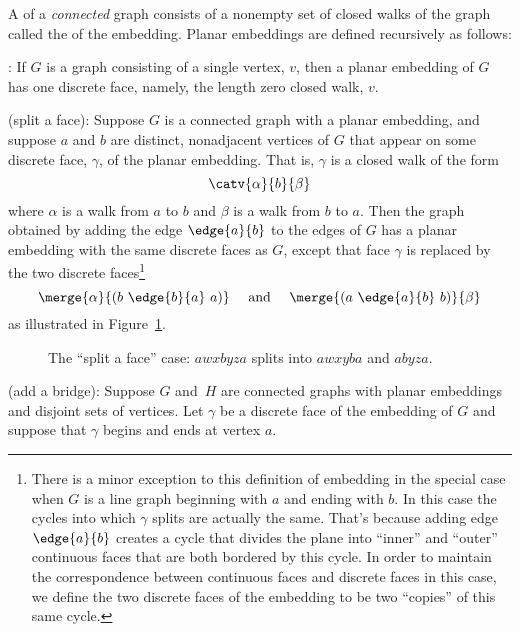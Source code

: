 \begin{definition}\label{def:embedding}%
A  of a \emph{connected} graph consists of a
nonempty set of closed walks of the graph called the  of the embedding.  Planar embeddings are defined recursively
as follows:

: If $G$ is a graph consisting of a single
vertex, $v$, then a planar embedding of $G$ has one discrete face,
namely, the length zero closed walk, $v$.

 (split a face): Suppose $G$ is a
connected graph with a planar embedding, and suppose $a$ and $b$ are
distinct, nonadjacent vertices of $G$ that appear on some discrete
face, $\gamma$, of the planar embedding.  That is, $\gamma$ is a
closed walk of the form
\[
\catv{\alpha}{b}{\beta}
\]
where $\alpha$ is a walk from $a$ to $b$ and $\beta$ is a walk from
$b$ to $a$.  Then the graph obtained by adding the edge $\edge{a}{b}$
to the edges of $G$ has a planar embedding with the same discrete
faces as $G$, except that face $\gamma$ is replaced by the two
discrete faces\footnote{\label{C} There is a minor exception to this
  definition of embedding in the special case when $G$ is a line graph
  beginning with $a$ and ending with $b$.  In this case the cycles
  into which $\gamma$ splits are actually the same.  That's because
  adding edge $\edge{a}{b}$ creates a cycle that divides the plane
  into ``inner'' and ``outer'' continuous faces that are both bordered
  by this cycle.  In order to maintain the correspondence between
  continuous faces and discrete faces in this case, we define the two
  discrete faces of the embedding to be two ``copies'' of this same
  cycle.}
\[
\merge{\alpha}{(b\ \edge{b}{a}\ a)}
 \quad \text{ and } \quad \merge{(a\ \edge{a}{b}\ b)}{\beta}
\]
as illustrated in Figure~\ref{fig:face-splitting}.

\begin{figure}


\caption{The ``split a face'' case: $awxbyza$ splits into $awxyba$ and $abyza$.}
\label{fig:face-splitting}
\end{figure}

 (add a bridge): Suppose $G$ and~$H$
are connected graphs with planar embeddings and disjoint sets of
vertices.  Let $\gamma$ be a discrete face of the embedding of $G$ and
suppose that $\gamma$ begins and ends at vertex $a$.
\iffalse
That is, $\gamma$ is of the form
\[
a\dots a.
\]
\fi


\end{definition}

